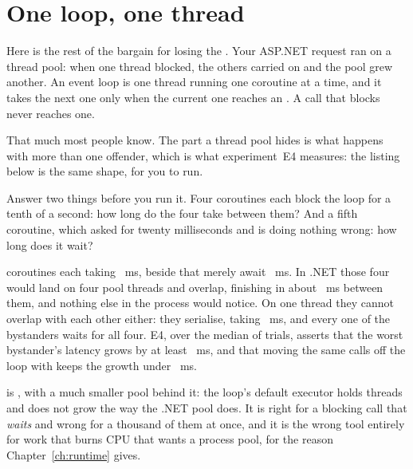 \section{One loop, one thread}
\label{sec:asyncio-one-thread}

Here is the rest of the bargain for losing the .
Your ASP.NET request ran on a thread pool: when one thread blocked, the
others carried on and the pool grew another. An event loop is one thread
running one coroutine at a time, and it takes the next one only when the
current one reaches an . A call that blocks never reaches one.

That much most people know. The part a thread pool hides is what happens
with more than one offender, which is what experiment~E4 measures: the
listing below is the same shape, for you to run.


\noindent
Answer two things before you run it. Four coroutines each block the loop
for a tenth of a second: how long do the four take between them? And a
fifth coroutine, which asked for twenty milliseconds and is doing nothing
wrong: how long does it wait?

 coroutines each taking ~ms, beside
 that merely await ~ms. In .NET those
four would land on four pool threads and overlap, finishing in about
~ms between them, and nothing else in the process would
notice. On one thread they cannot overlap with each other either: they
serialise, taking ~ms, and every one of the
 bystanders waits for all four. E4, over the median of
 trials, asserts that the worst bystander's latency grows
by at least ~ms, and that moving the same calls off
the loop with
 keeps the growth under
~ms.


\begin{csbox}
 is , with a much smaller pool behind it:
the loop's default executor holds  threads
and does not grow the way the .NET pool does. It is right for a blocking
call that \emph{waits} and wrong for a thousand of them at once, and it is
the wrong tool entirely for work that burns CPU \dash{} that wants a
process pool, for the reason Chapter~\ref{ch:runtime} gives.
\end{csbox}

